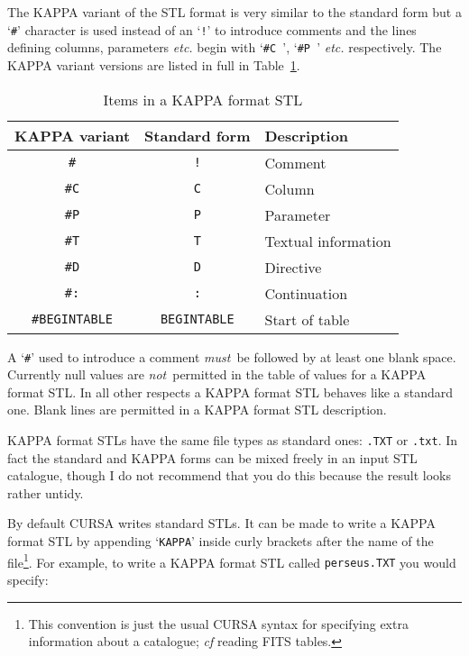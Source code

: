 \documentclass[twoside,11pt]{article}
\renewcommand{\_}{\texttt{\symbol{95}}}
\begin{document}
The KAPPA variant of the STL format is very similar to the standard
form but a `{\tt \#}' character is used instead of an `{\tt !}' to
introduce comments and the lines defining columns, parameters \emph{etc.}
begin with `{\tt \#C~}', `{\tt \#P~}' \emph{etc.} respectively.  The
KAPPA variant versions are listed in full in Table~\ref{KAP_ITEM}.

\begin{table}[htbp]

\begin{center}
\begin{tabular}{ccl}
KAPPA variant  &  Standard form & Description \\ \hline
{\tt \#}        & {\tt !}        & Comment \\
{\tt \#C}       & {\tt C}        & Column \\
{\tt \#P}       & {\tt P}        & Parameter \\
{\tt \#T}       & {\tt T}        & Textual information \\
{\tt \#D}       & {\tt D}        & Directive \\
{\tt \#:}       & {\tt :}        & Continuation \\
{\tt \#BEGINTABLE} & {\tt BEGINTABLE} & Start of table \\

\end{tabular}
\end{center}

\caption{\label{KAP_ITEM}Items in a KAPPA format STL}

\end{table}

A `{\tt \#}' used to introduce a comment {\it must}\, be followed by at
least one blank space.  Currently null values are {\it not}\, permitted
in the table of values for a KAPPA format STL.  In all other respects a
KAPPA format STL behaves like a standard one.  Blank lines are permitted
in a KAPPA format STL description.

KAPPA format STLs have the same file types as standard ones: {\tt .TXT}
or {\tt .txt}.  In fact the standard and KAPPA forms can be mixed freely
in an input STL catalogue, though I do not recommend that you do this
because the result looks rather untidy.

By default CURSA writes standard STLs.  It can be made to write a KAPPA
format STL by appending `{\tt KAPPA}' inside curly brackets after the
name of the file\footnote{This convention is just the usual CURSA
syntax for specifying extra information about a catalogue; {\it cf}\/
reading FITS tables.}.  For example, to write a KAPPA format STL called
{\tt perseus.TXT} you would specify:
\end{document}
